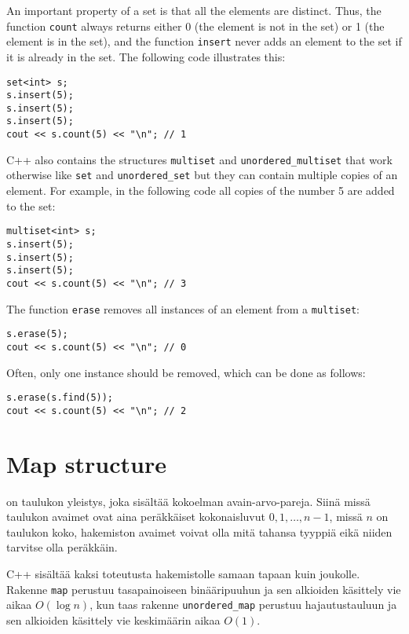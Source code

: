 An important property of a set is
that all the elements are distinct.
Thus, the function \texttt{count} always returns
either 0 (the element is not in the set)
or 1 (the element is in the set),
and the function \texttt{insert} never adds
an element to the set if it is
already in the set.
The following code illustrates this:

\begin{lstlisting}
set<int> s;
s.insert(5);
s.insert(5);
s.insert(5);
cout << s.count(5) << "\n"; // 1
\end{lstlisting}


C++ also contains the structures
\texttt{multiset} and \texttt{unordered\_multiset}
that work otherwise like \texttt{set}
and \texttt{unordered\_set}
but they can contain multiple copies of an element.
For example, in the following code all copies
of the number 5 are added to the set:

\begin{lstlisting}
multiset<int> s;
s.insert(5);
s.insert(5);
s.insert(5);
cout << s.count(5) << "\n"; // 3
\end{lstlisting}
The function \texttt{erase} removes
all instances of an element
from a \texttt{multiset}:
\begin{lstlisting}
s.erase(5);
cout << s.count(5) << "\n"; // 0
\end{lstlisting}
Often, only one instance should be removed,
which can be done as follows:
\begin{lstlisting}
s.erase(s.find(5));
cout << s.count(5) << "\n"; // 2
\end{lstlisting}

\section{Map structure}


 on taulukon yleistys,
joka sisältää kokoelman avain-arvo-pareja.
Siinä missä taulukon avaimet ovat aina peräkkäiset
kokonaisluvut $0,1,\ldots,n-1$,
missä $n$ on taulukon koko,
hakemiston avaimet voivat
olla mitä tahansa tyyppiä
eikä niiden tarvitse olla peräkkäin.

C++ sisältää kaksi toteutusta hakemistolle
samaan tapaan kuin joukolle.
Rakenne
\texttt{map} perustuu
tasapainoiseen binääripuuhun ja sen
alkioiden käsittely vie aikaa $O(\log n)$,
kun taas rakenne
\texttt{unordered\_map} perustuu
hajautustauluun ja sen alkioiden
käsittely vie keskimäärin aikaa $O(1)$.

